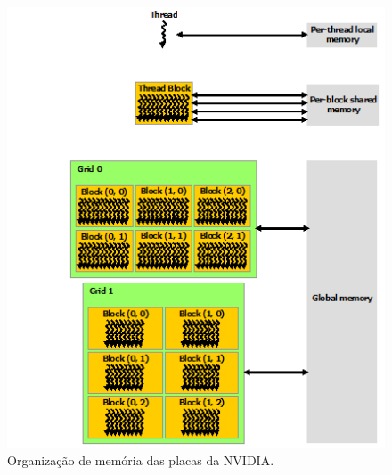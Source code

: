 \begin{figure}[t]
\centering\includegraphics{monografia/cuda_memory}
\caption{Organização de memória das placas da NVIDIA.}
\label{cuda_memory}
\end{figure}


